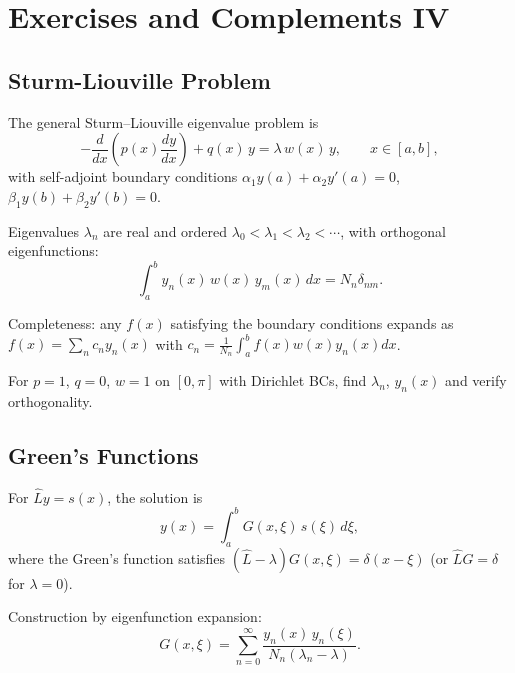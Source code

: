\chapter{Exercises and Complements IV}

\section{Sturm-Liouville Problem}

The general Sturm--Liouville eigenvalue problem is
\begin{equation}
-\frac{d}{dx}\!\left(p(x)\frac{dy}{dx}\right) + q(x)\,y = \lambda\,w(x)\,y,
\qquad x\in[a,b],
\label{eq:8.1.1}
\end{equation}
with self-adjoint boundary conditions
$\alpha_1 y(a)+\alpha_2 y'(a)=0$,
$\beta_1 y(b)+\beta_2 y'(b)=0$.

Eigenvalues $\lambda_n$ are real and ordered
$\lambda_0<\lambda_1<\lambda_2<\cdots$, with orthogonal eigenfunctions:
\begin{equation}
\int_a^b y_n(x)\,w(x)\,y_m(x)\,dx = N_n\delta_{nm}.
\label{eq:8.1.2}
\end{equation}

Completeness: any $f(x)$ satisfying the boundary conditions expands as
$f(x)=\sum_n c_n y_n(x)$ with
$c_n = \frac{1}{N_n}\int_a^b f(x)w(x)y_n(x)dx$.

\begin{exercise}
For $p=1$, $q=0$, $w=1$ on $[0,\pi]$ with Dirichlet BCs,
find $\lambda_n$, $y_n(x)$ and verify orthogonality.
\end{exercise}

\section{Green's Functions}

For $\hat L y = s(x)$, the solution is
\begin{equation}
y(x) = \int_a^b G(x,\xi)\,s(\xi)\,d\xi,
\label{eq:8.2.1}
\end{equation}
where the Green's function satisfies
$(\hat L-\lambda)G(x,\xi) = \delta(x-\xi)$ (or $\hat L G=\delta$ for $\lambda=0$).

Construction by eigenfunction expansion:
\begin{equation}
G(x,\xi) = \sum_{n=0}^{\infty}\frac{y_n(x)\,y_n(\xi)}{N_n(\lambda_n-\lambda)}.
\label{eq:8.2.2}
\end{equation}

